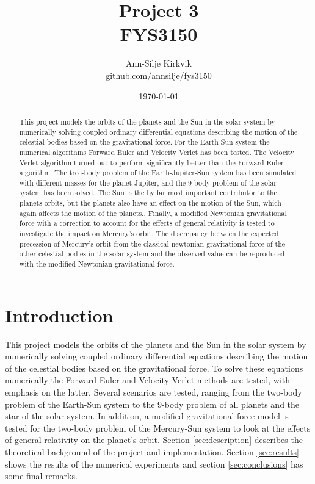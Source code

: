 \documentclass{article}
\begin{document}
\title{\vspace{1cm}Project 3 \\ FYS3150}

\author{\vspace{1cm}Ann-Silje Kirkvik \\ github.com/annsilje/fys3150}
\date{\vspace{5cm}\today}

\maketitle

\newpage

\begin{abstract}
This project models the orbits of the planets and the Sun in the solar system by numerically solving coupled ordinary differential equations describing the motion of the celestial bodies based on the gravitational force. For the Earth-Sun system the numerical algorithms Forward Euler and Velocity Verlet has been tested. The Velocity Verlet algorithm turned out to perform significantly better than the Forward Euler algorithm. The tree-body problem of the Earth-Jupiter-Sun system has been simulated with different masses for the planet Jupiter, and the 9-body problem of the solar system has been solved. The Sun is the by far most important contributor to the planets orbits, but the planets also have an effect on the motion of the Sun, which again affects the motion of the planets.. Finally, a modified Newtonian gravitational force with a correction to account for the effects of general relativity is tested to investigate the impact on Mercury's orbit. The discrepancy between the expected precession of Mercury's orbit from the classical newtonian gravitational force of the other celestial bodies in the solar system and the observed value can be reproduced with the modified Newtonian gravitational force.
\end{abstract}

\vspace{1cm}


\section{Introduction}
This project models the orbits of the planets and the Sun in the solar system by numerically solving coupled ordinary differential equations describing the motion of the celestial bodies based on the gravitational force. To solve these equations numerically the Forward Euler and Velocity Verlet methods are tested, with emphasis on the latter. Several scenarios are tested, ranging from the two-body problem of the Earth-Sun system to the 9-body problem of all planets and the star of the solar system. In addition, a modified gravitational force model is tested for the two-body problem of the Mercury-Sun system to look at the effects of general relativity on the planet's orbit. Section \ref{sec:description} describes the theoretical background of the project and implementation. Section \ref{sec:results} shows the results of the numerical experiments and section \ref{sec:conclusions} has some final remarks.
\end{document}
